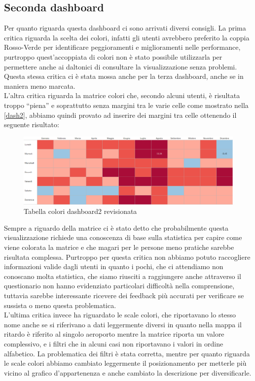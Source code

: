 \documentclass[12pt]{article}
\begin{document}
\subsection{Seconda dashboard}
Per quanto riguarda questa dashboard ci sono arrivati diversi consigli. La prima critica riguarda la scelta dei colori, infatti gli utenti avrebbero preferito la coppia Rosso-Verde per identificare peggioramenti e miglioramenti nelle performance, purtroppo quest'accoppiata di colori non è stato possibile utilizzarla per permettere anche ai daltonici di consultare la visualizzazione senza problemi. Questa stessa critica ci è stata mossa anche per la terza dashboard, anche se in maniera meno marcata.\\
L'altra critica riguarda la matrice colori che, secondo alcuni utenti, è risultata troppo ``piena'' e soprattutto senza margini tra le varie celle come mostrato nella \ref{dash2}, abbiamo quindi provato ad inserire dei margini tra celle ottenendo il seguente risultato:
\begin{figure}[H]
    \includegraphics[scale = 0.5]{img/dashboard/tabella_colori_bordo.png}
    \caption{Tabella colori dashboard2 revisionata}
\end{figure}
\noindent Sempre a riguardo della matrice ci è stato detto che probabilmente questa visualizzazione richiede una conoscenza di base sulla statistica per capire come viene colorata la matrice e che magari per le persone meno pratiche sarebbe risultata complessa. Purtroppo per questa critica non abbiamo potuto raccogliere informazioni valide dagli utenti in quanto i pochi, che ci attendiamo non conoscano molta statistica, che siamo riusciti a raggiungere anche attraverso il questionario non hanno evidenziato particolari difficoltà nella comprensione, tuttavia sarebbe interessante ricevere dei feedback più accurati per verificare se sussista o meno questa problematica.\\ 
L'ultima critica invece ha riguardato le scale colori, che riportavano lo stesso nome anche se si riferivano a dati leggermente diversi in quanto nella mappa il ritardo è riferito al singolo aeroporto mentre la matrice riporta un valore complessivo, e i filtri che in alcuni casi non riportavano i valori in ordine alfabetico. La problematica dei filtri è stata corretta, mentre per quanto riguarda le scale colori abbiamo cambiato leggermente il posizionamento per metterle più vicino al grafico d'appartenenza e anche cambiato la descrizione per diversificarle.
\end{document}
